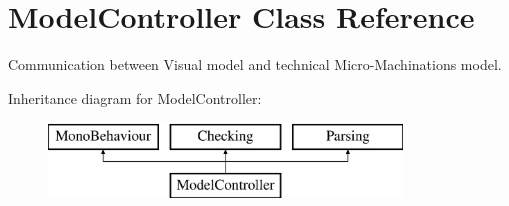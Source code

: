 \hypertarget{class_model_controller}{}\section{Model\+Controller Class Reference}
\label{class_model_controller}


Communication between Visual model and technical Micro-\/\+Machinations model.  


Inheritance diagram for Model\+Controller\+:\begin{figure}[H]
\begin{center}
\leavevmode
\includegraphics[height=2.000000cm]{class_model_controller}
\end{center}
\end{figure}
